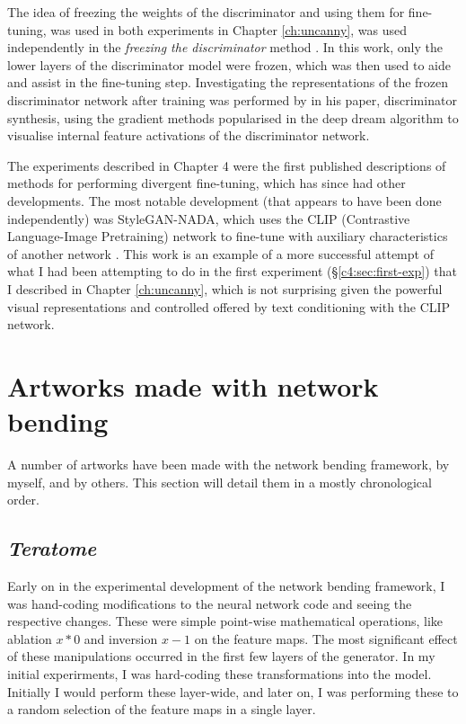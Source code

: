 The idea of freezing the weights of the discriminator and using them for fine-tuning, was used in both experiments in Chapter \ref{ch:uncanny}, was used independently in the \textit{freezing the discriminator} method \citep{mo2020freeze}. In this work, only the lower layers of the discriminator model were frozen, which was then used to aide and assist in the fine-tuning step.
Investigating the representations of the frozen discriminator network after training was performed by \citet{porres2021discriminator} in his paper, discriminator synthesis, using the gradient methods popularised in the deep dream algorithm to visualise internal feature activations of the discriminator network.

The experiments described in Chapter 4 were the first published descriptions of methods for performing divergent fine-tuning, which has since had other developments. 
The most notable development (that appears to have been done independently) was StyleGAN-NADA, which uses the CLIP (Contrastive Language-Image Pretraining) \cite{radford2021learning} network to fine-tune with auxiliary characteristics of another network \citep{gal2022stylegan}. 
This work is an example of a more successful attempt of what I had been attempting to do in the first experiment (\S \ref{c4:sec:first-exp}) that I described in Chapter \ref{ch:uncanny}, which is not surprising given the powerful visual representations and controlled offered by text conditioning with the CLIP network.


\section{Artworks made with network bending}

A number of artworks have been made with the network bending framework, by myself, and by others. 
This section will detail them in a mostly chronological order.

\subsection{\textit{Teratome}}

Early on in the experimental development of the network bending framework, I was hand-coding modifications to the neural network code and seeing the respective changes. 
These were simple point-wise mathematical operations, like ablation $x*0$ and inversion $x-1$ on the feature maps. 
The most significant effect of these manipulations occurred in the first few layers of the generator. 
In my initial experirments, I was hard-coding these transformations into the model. Initially I would perform these layer-wide, and later on, I was performing these to a random selection of the feature maps in a single layer. 

